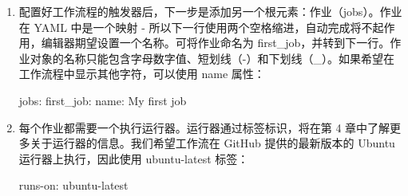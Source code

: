 \begin{enumerate}
如果在第一个元素后面添加一个逗号，然后再次点击 Control + Space，则可以从自动完成中选择其他元素（见图 1.11）：


每个触发器都是一个映射，并且可以包含附加参数。如果将光标放在 on: 下面的行上并添加两个空格的缩进，自动完成将使用完整的 YAML 语法给出结果，还会给出可用于配置每个触发器的属性（见图 1.12）：


请注意，大多数参数 - 例如，分支或路径 - 都是序列，如果不使用 JSON 语法，则需要每个条目使用一个短划线。

我们希望测试工作流程在每次推送到 main 分支时运行，还希望能够手动进行触发（请参阅触发工作流的事件部分）。工作流触发器代码好似如下所示：

\begin{shell}
on:
  push:
    branches:
      - main
  workflow_dispatch:
\end{shell}

\begin{myNotic}{通配符}
* 字符可以用作路径中的通配符，** 用作递归通配符。* 是 YAML 中的特殊字符，所以需要使用引号：

\begin{shell}
push:
  branches:
    - 'release/**'
  paths:
    - 'doc/**'
\end{shell}
\end{myNotic}

\item 
配置好工作流程的触发器后，下一步是添加另一个根元素：作业（jobs）。作业在 YAML 中是一个映射 - 所以下一行使用两个空格缩进，自动完成将不起作用，编辑器期望设置一个名称。可将作业命名为 first\_job，并转到下一行。作业对象的名称只能包含字母数字值、短划线（-）和下划线（\_）。如果希望在工作流程中显示其他字符，可以使用 name 属性：

\begin{shell}
jobs:
  first_job:
    name: My first job
\end{shell}

\item 
每个作业都需要一个执行运行器。运行器通过标签标识，将在第 4 章中了解更多关于运行器的信息。我们希望工作流在 GitHub 提供的最新版本的 Ubuntu 运行器上执行，因此使用 ubuntu-latest 标签：

\begin{shell}
runs-on: ubuntu-latest
\end{shell}


\end{enumerate}
